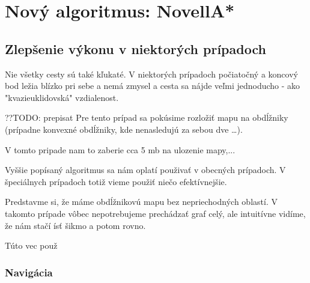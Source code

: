 \chapter{Nový algoritmus: NovellA*}

\section{Zlepšenie výkonu v niektorých prípadoch}
Nie všetky cesty sú také kľukaté. V niektorých prípadoch
počiatočný a koncový bod ležia blízko pri sebe a nemá zmysel a cesta sa nájde 
veľmi jednoducho - ako "kvazieuklidovská" vzdialenost.

??TODO: prepisat
Pre tento prípad sa pokúsime rozložiť mapu na obdĺžniky
(prípadne konvexné obdĺžniky, kde nenasledujú za sebou dve \dots).

V tomto pripade nam to zaberie cca 5 mb na ulozenie mapy,...


Vyššie popísaný algoritmus sa nám oplatí použivať v obecných prípadoch.
V špeciálnych prípadoch totiž vieme použiť niečo efektívnejšie.

Predstavme si, že máme obdĺžnikovú mapu bez nepriechodných oblastí. V takomto prípade vôbec nepotrebujeme
prechádzať graf 
celý, ale intuitívne vidíme, že nám stačí ísť šikmo a potom rovno.

Túto vec použ
\subsection{Navigácia}

